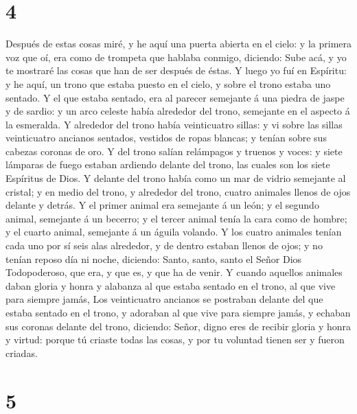 \hypertarget{section-3}{%
\section{4}\label{section-3}}

 Después de estas cosas miré, y he aquí una puerta abierta
en el cielo: y la primera voz que oí, era como de trompeta que hablaba
conmigo, diciendo: Sube acá, y yo te mostraré las cosas que han de ser
después de éstas.  Y luego yo fuí en Espíritu: y he aquí, un
trono que estaba puesto en el cielo, y sobre el trono estaba uno
sentado.  Y el que estaba sentado, era al parecer semejante
á una piedra de jaspe y de sardio: y un arco celeste había alrededor del
trono, semejante en el aspecto á la esmeralda.  Y alrededor
del trono había veinticuatro sillas: y vi sobre las sillas veinticuatro
ancianos sentados, vestidos de ropas blancas; y tenían sobre sus cabezas
coronas de oro.  Y del trono salían relámpagos y truenos y
voces: y siete lámparas de fuego estaban ardiendo delante del trono, las
cuales son los siete Espíritus de Dios.  Y delante del trono
había como un mar de vidrio semejante al cristal; y en medio del trono,
y alrededor del trono, cuatro animales llenos de ojos delante y detrás.
 Y el primer animal era semejante á un león; y el segundo
animal, semejante á un becerro; y el tercer animal tenía la cara como de
hombre; y el cuarto animal, semejante á un águila volando. 
Y los cuatro animales tenían cada uno por sí seis alas alrededor, y de
dentro estaban llenos de ojos; y no tenían reposo día ni noche,
diciendo: Santo, santo, santo el Señor Dios Todopoderoso, que era, y que
es, y que ha de venir.  Y cuando aquellos animales daban
gloria y honra y alabanza al que estaba sentado en el trono, al que vive
para siempre jamás,  Los veinticuatro ancianos se postraban
delante del que estaba sentado en el trono, y adoraban al que vive para
siempre jamás, y echaban sus coronas delante del trono, diciendo:
 Señor, digno eres de recibir gloria y honra y virtud:
porque tú criaste todas las cosas, y por tu voluntad tienen ser y fueron
criadas.

\hypertarget{section-4}{%
\section{5}\label{section-4}}

